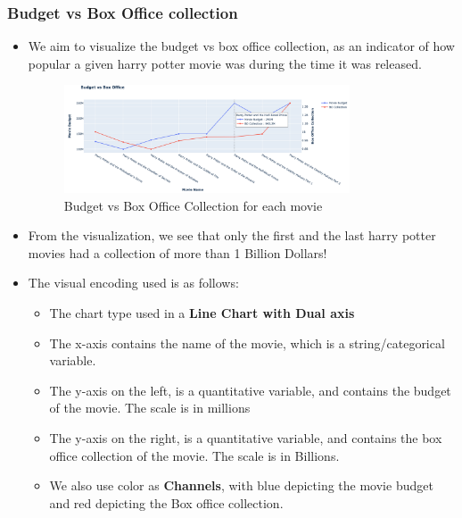 \documentclass[a4paper]{article}
\begin{document}
\subsubsection{Budget vs Box Office collection}
\begin{itemize}
    \item We aim to visualize the budget vs box office collection, as an indicator of how popular a given harry potter movie was during the time it was released.
    \begin{figure}[H]
        \centering
        \includegraphics[width=0.8\textwidth]{box_office}
        \caption{Budget vs Box Office Collection for each movie}
        \label{fig:box_office}
    \end{figure}
    \item From the visualization, we see that only the first and the last harry potter movies had a collection of more than 1 Billion Dollars!
    \item The visual encoding used is as follows:
    \begin{itemize}
        \item The chart type used in a \textbf{Line Chart with Dual axis}  
        \item The x-axis contains the name of the movie, which is a string/categorical variable.
        \item The y-axis on the left, is a quantitative variable, and contains the budget of the movie. The scale is in millions
        \item The y-axis on the right, is a quantitative variable, and contains the box office collection of the movie. The scale is in Billions.
        \item We also use color as \textbf{Channels}, with blue depicting the movie budget and red depicting the Box office collection.  
    \end{itemize}
\end{itemize}
\end{document}
